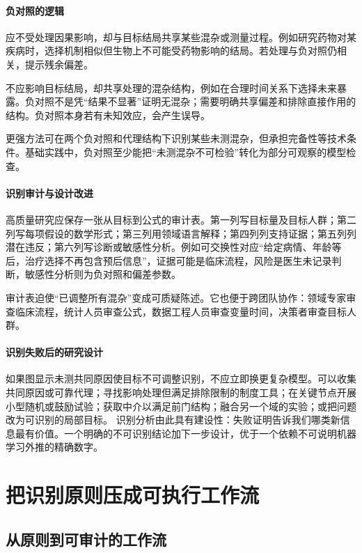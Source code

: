 \paragraph{负对照的逻辑}

应不受处理因果影响，却与目标结局共享某些混杂或测量过程。例如研究药物对某疾病时，选择机制相似但生物上不可能受药物影响的结局。若处理与负对照仍相关，提示残余偏差\parencite{lipsitch2010}。

不应影响目标结局，却共享处理的混杂结构，例如在合理时间关系下选择未来暴露。负对照不是凭“结果不显著”证明无混杂；需要明确共享偏差和排除直接作用的结构。负对照本身若有未知效应，会产生误导。

更强方法可在两个负对照和代理结构下识别某些未测混杂，但承担完备性等技术条件。基础实践中，负对照至少能把“未测混杂不可检验”转化为部分可观察的模型检查。

\paragraph{识别审计与设计改进}

高质量研究应保存一张从目标到公式的审计表。第一列写目标量及目标人群；第二列写每项假设的数学形式；第三列用领域语言解释；第四列列支持证据；第五列列潜在违反；第六列写诊断或敏感性分析。例如可交换性对应“给定病情、年龄等后，治疗选择不再包含预后信息”，证据可能是临床流程，风险是医生未记录判断，敏感性分析则为负对照和偏差参数。

审计表迫使“已调整所有混杂”变成可质疑陈述。它也便于跨团队协作：领域专家审查临床流程，统计人员审查公式，数据工程人员审查变量时间，决策者审查目标人群。

\paragraph{识别失败后的研究设计}

如果图显示未测共同原因使目标不可调整识别，不应立即换更复杂模型。可以收集共同原因或可靠代理；寻找影响处理但满足排除限制的制度工具；在关键节点开展小型随机或鼓励试验；获取中介以满足前门结构；融合另一个域的实验；或把问题改为可识别的局部目标。
识别分析由此具有建设性：失败证明告诉我们哪类新信息最有价值。一个明确的不可识别结论加下一步设计，优于一个依赖不可说明机器学习外推的精确数字。

\section{把识别原则压成可执行工作流}

\subsection{从原则到可审计的工作流}

